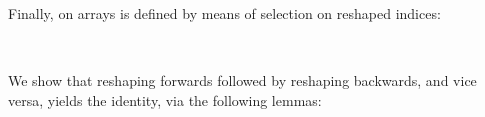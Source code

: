 Finally,  on arrays is defined by means of selection
on reshaped indices: 
\begin{code}%
%
\>[2]\AgdaSpace{}%
\AgdaSymbol{:}\AgdaSpace{}%
\AgdaSpace{}%
\AgdaSpace{}%
\AgdaSpace{}%
\AgdaSpace{}%
\AgdaSpace{}%
\AgdaSpace{}%
\AgdaSpace{}%
%
\>[36]\AgdaSpace{}%
\AgdaSpace{}%
\<%
\\
%
\>[2]\AgdaSpace{}%
\AgdaSpace{}%
\AgdaSpace{}%
\AgdaSymbol{=}\AgdaSpace{}%
\AgdaSpace{}%
\AgdaSpace{}%
\AgdaSpace{}%
\AgdaSpace{}%
\AgdaSpace{}%
\AgdaOperator{\AgdaFunction{[}}\AgdaSpace{}%
\AgdaSpace{}%
\AgdaSpace{}%
\AgdaSpace{}%
\AgdaSpace{}%
\AgdaOperator{\AgdaFunction{]}}\<%
\end{code}
We show that reshaping forwards followed by reshaping backwards, and vice
versa, yields the identity, via the following lemmas:
